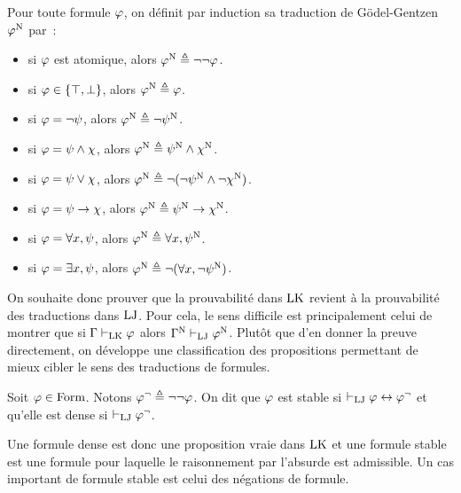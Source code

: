 \begin{definition}
  \label{def.gg.trad}
  Pour toute formule $\varphi$, on définit par induction sa traduction de
  Gödel-Gentzen $\varphi^{\mathrm{N}}$ par~:
  \begin{itemize}
  \item si $\varphi$ est atomique, alors
    $\varphi^{\mathrm{N}} \triangleq \lnot\lnot\varphi$.
  \item si $\varphi \in\{\top,\bot\}$, alors $\varphi^{\mathrm{N}} \triangleq \varphi$.
  \item si $\varphi = \lnot \psi$, alors
    $\varphi^{\mathrm{N}}\triangleq\lnot\psi^{\mathrm{N}}$.
  \item si $\varphi = \psi\land\chi$, alors
    $\varphi^{\mathrm{N}}\triangleq\psi^{\mathrm{N}}\land\chi^{\mathrm{N}}$.
  \item si $\varphi = \psi\lor\chi$, alors
    $\varphi^{\mathrm{N}}\triangleq\lnot(\lnot\psi^{\mathrm{N}}\land\lnot\chi^{\mathrm{N}})$.
  \item si $\varphi = \psi \to \chi$, alors
    $\varphi^{\mathrm{N}}\triangleq\psi^{\mathrm{N}}\to\chi^{\mathrm{N}}$.
  \item si $\varphi = \forall x, \psi$, alors
    $\varphi^{\mathrm{N}}\triangleq \forall x, \psi^{\mathrm{N}}$.
  \item si $\varphi = \exists x, \psi$, alors
    $\varphi^{\mathrm{N}}\triangleq \lnot(\forall x, \lnot\psi^{\mathrm{N}})$.
  \end{itemize}
\end{definition}

On souhaite donc prouver que la prouvabilité dans $\operatorname{LK}$ revient à la
prouvabilité des traductions dans $\operatorname{LJ}$. Pour cela, le sens difficile est
principalement celui de montrer que si $\Gamma\vdash_{\operatorname{LK}}\varphi$ alors
$\Gamma^{\mathrm{N}} \vdash_{\operatorname{LJ}} \varphi^{\mathrm{N}}$. Plutôt que d'en donner la preuve
directement, on développe une classification des propositions permettant de
mieux cibler le sens des traductions de formules.

\begin{definition}
  Soit $\varphi \in \operatorname{Form}$. Notons $\varphi^\lnot \triangleq \lnot\lnot\varphi$.
  On dit que $\varphi$ est stable si
  $\vdash_{\operatorname{LJ}} \varphi\mathrel{\leftrightarrow}\varphi^\lnot$ et qu'elle est
  dense si $\vdash_{\operatorname{LJ}} \varphi^\lnot$.
\end{definition}

Une formule dense est donc une proposition vraie dans $\operatorname{LK}$ et une
formule stable est une formule pour laquelle le raisonnement par l'absurde est
admissible. Un cas important de formule stable est celui des négations de
formule.

